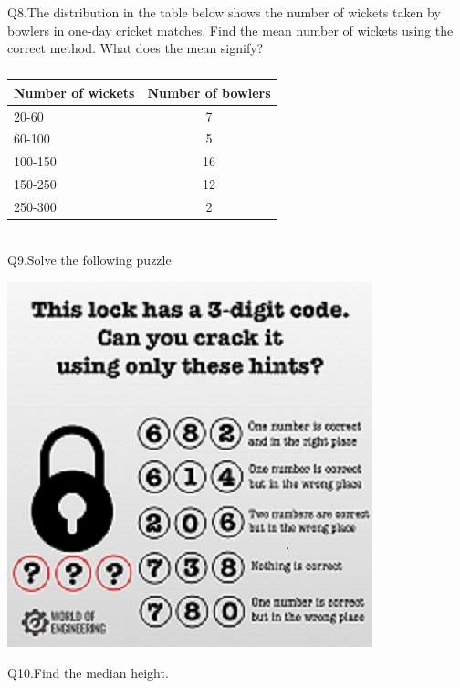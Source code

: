 \documentclass[12pt]{article}
\begin{document}
	Q8.The distribution in the table below shows the number of wickets taken by bowlers in one-day cricket matches. Find the mean number of wickets using the correct method. What does the mean signify?
	\begin{table}[h!]
		\begin{center}
			\caption{}
			\begin{tabular}{l|c} 
				\textbf{Number of wickets} & \textbf{Number of bowlers}\\
				\hline
				20-60 & 7\\
				60-100 &5\\
				100-150 & 16\\
				150-250 & 12\\
				250-300&2\\
				
				
			\end{tabular}
		\end{center}
	\end{table}\\
	\newpage
	Q9.Solve the following puzzle
	\vspace{1cm}
	\begin{center}
		
		\includegraphics{puzzle.jpg}\\
		
		\label{puzzle}
	\end{center}
	\vspace{1.5cm}
	Q10.Find the median height.
\end{document}
